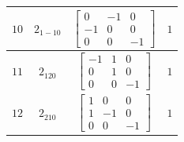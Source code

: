 \documentclass[fleqn,8pt]{jsarticle}
\begin{document}
\begin{longtable}{cccc}
$ 10 $ & $ 2{}_{1-10} $ & $ \begin{bmatrix} 0 & -1 & 0 \\ -1 & 0 & 0 \\ 0 & 0 & -1 \end{bmatrix} $ & $ 1 $ \\ \hline
$ 11 $ & $ 2{}_{120} $ & $ \begin{bmatrix} -1 & 1 & 0 \\ 0 & 1 & 0 \\ 0 & 0 & -1 \end{bmatrix} $ & $ 1 $ \\ \hline
$ 12 $ & $ 2{}_{210} $ & $ \begin{bmatrix} 1 & 0 & 0 \\ 1 & -1 & 0 \\ 0 & 0 & -1 \end{bmatrix} $ & $ 1 $ \\
\end{longtable}
\end{document}
